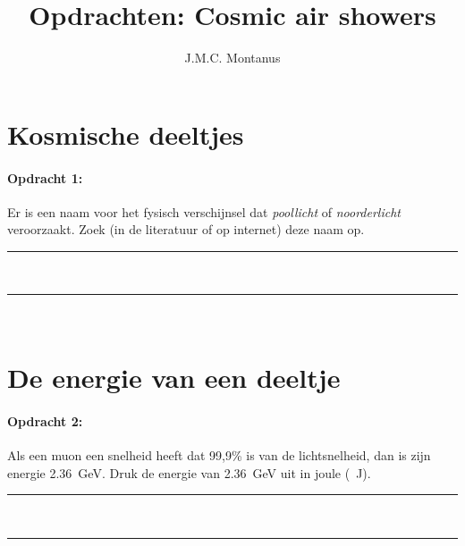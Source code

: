 

\title{Opdrachten: Cosmic air showers}
\author{J.M.C. Montanus}



\maketitle

\section{Kosmische deeltjes}

\begin{minipage}[t]{1\columnwidth}
\paragraph{Opdracht 1:}
Er is een naam voor het fysisch verschijnsel dat \emph{poollicht} of
\emph{noorderlicht} veroorzaakt. Zoek (in de literatuur of op internet)
deze naam op.
\begin{center}
    \rule{\textwidth}{0.3mm}\\
    \rule{\textwidth}{0.3mm}\\
\end{center}
\end{minipage}
\bigskip{}


\section{De energie van een deeltje}

\begin{minipage}[t]{1\columnwidth}
\paragraph{Opdracht 2:}
Als een muon een snelheid heeft dat 99,9\% is van de lichtsnelheid, dan
is zijn energie \SI{2,36}{\giga\electronvolt}. Druk de energie van
\SI{2,36}{\giga\electronvolt} uit in joule (\SI{}{\joule}).
\begin{center}
    \rule{\textwidth}{0.3mm}\\
    \rule{\textwidth}{0.3mm}\\
\end{center}
\end{minipage}
\bigskip{}

